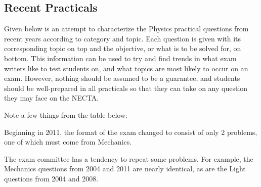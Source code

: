 \subsection{Recent Practicals}
Given below is an attempt to characterize the Physics practical questions from recent years according to category and topic. Each question is given with its corresponding topic on top and the objective, or what is to be solved for, on bottom. This information can be used to try and find trends in what exam writers like to test students on, and what topics are most likely to occur on an exam. However, nothing should be assumed to be a guarantee, and students should be well-prepared in all practicals so that they can take on any question they may face on the NECTA.

Note a few things from the table below:
\begin{itemize*}
\item Beginning in 2011, the format of the exam changed to consist of only 2 problems, one of which must come from Mechanics.
\item The exam committee has a tendency to repeat some problems. For example, the Mechanics questions from 2004 and 2011 are nearly identical, as are the Light questions from 2004 and 2008.
\end{itemize*}

